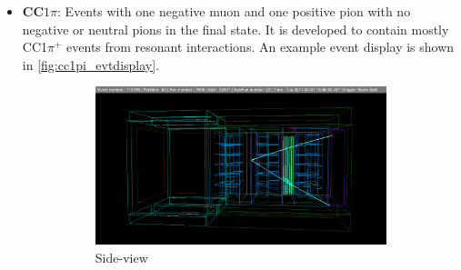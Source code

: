 \begin{itemize}
\item \textbf{CC$1\pi$}: Events with one negative muon and one positive pion with no negative or neutral pions in the final state. It is developed to contain mostly CC1$\pi^{+}$ events from resonant interactions. An example event display is shown in \autoref{fig:cc1pi_evtdisplay}. 
\begin{figure}[htbp]
	\begin{subfigure}[t]{0.49\textwidth}
		\includegraphics[width=\textwidth, trim={4cm 2cm 4cm 3cm}, clip]{figures/numu/evtdisplay/CC1pi_7508_22_119769_perpX0Z_all}
		\caption{Side-view}
	\end{subfigure}
	\begin{subfigure}[t]{0.49\textwidth}

\end{subfigure}
\end{figure}
\end{itemize}
